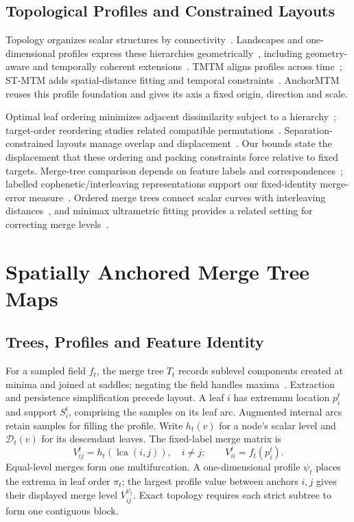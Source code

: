 \documentclass[review]{vgtc}
\newcommand{\lca}{\operatorname{lca}}
\begin{document}
\subsection{Topological Profiles and Constrained Layouts}
Topology organizes scalar structures by connectivity~\cite{Heine:2016:Survey}. Landscapes and one-dimensional profiles express these hierarchies geometrically~\cite{Weber:2007:TL,Oesterling:2013:TLP}, including geometry-aware and temporally coherent extensions~\cite{Beketayev:2012:GPTL,Herick:2020:TCTL}. TMTM aligns profiles across time~\cite{Koepp:2023:TMTM}; ST-MTM adds spatial-distance fitting and temporal constraints~\cite{STMTM:2026}. AnchorMTM reuses this profile foundation and gives its axis a fixed origin, direction and scale.

Optimal leaf ordering minimizes adjacent dissimilarity subject to a hierarchy~\cite{BarJoseph:2001:OLO}; target-order reordering studies related compatible permutations~\cite{Bulteau:2022:RT}. Separation-constrained layouts manage overlap and displacement~\cite{Dwyer:2006:IPSEP,Li:2019:SOI}. Our bounds state the displacement that these ordering and packing constraints force relative to fixed targets. Merge-tree comparison depends on feature labels and correspondences~\cite{Yan:2021:Survey}; labelled cophenetic/interleaving representations support our fixed-identity merge-error measure~\cite{Munch:2019:LINF,Gasparovic:2024:IID}. Ordered merge trees connect scalar curves with interleaving distances~\cite{Beurskens:2025:OMT}, and minimax ultrametric fitting provides a related setting for correcting merge levels~\cite{Farach:1995:RM}.

\section{Spatially Anchored Merge Tree Maps}\label{sec:formulation}\label{sec:background}
\subsection{Trees, Profiles and Feature Identity}
For a sampled field $f_t$, the merge tree $T_t$ records sublevel components created at minima and joined at saddles; negating the field handles maxima~\cite{Tierny:2018:TTK}. Extraction and persistence simplification precede layout. A leaf $i$ has extremum location $p_i^t$ and support $S_i^t$, comprising the samples on its leaf arc. Augmented internal arcs retain samples for filling the profile. Write $h_t(v)$ for a node's scalar level and $\mathcal{D}_t(v)$ for its descendant leaves. The fixed-label merge matrix is
\begin{equation}\label{eq:merge}
V_{ij}^t=h_t(\lca(i,j)),\quad i\ne j;\qquad V_{ii}^t=f_t(p_i^t).
\end{equation}
Equal-level merges form one multifurcation. A one-dimensional profile $\psi_t$ places the extrema in leaf order $\pi_t$; the largest profile value between anchors $i,j$ gives their displayed merge level $V_{ij}^{\psi_t}$. Exact topology requires each strict subtree to form one contiguous block.
\end{document}
